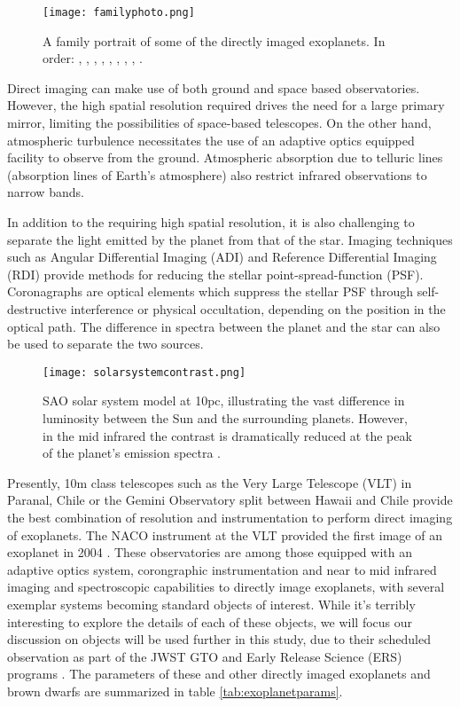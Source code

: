 \begin{figure}[t]
	\centering
	\texttt{[image: familyphoto.png]}
	\caption{A family portrait of some of the directly imaged exoplanets.
		In order:
	\parencite{Marois2010}, \parencite{Rameau2013}, \parencite{Stolker2020}, \parencite{Sallum2015}, \parencite{Keppler2018}, \parencite{Currie2012}, \parencite{Macintosh2015}, \parencite{Chauvin2004}, \parencite{Quanz2010}.}
	\label{fig:family}
\end{figure}

Direct imaging can make use of both ground and space based observatories. 
However, the high spatial resolution required drives the need for a large primary mirror, limiting the possibilities of space-based telescopes. 
On the other hand, atmospheric turbulence necessitates the use of an adaptive optics equipped facility to observe from the ground. 
Atmospheric absorption due to telluric lines (absorption lines of Earth's atmosphere) also restrict infrared observations to narrow bands.

In addition to the requiring high spatial resolution, it is also challenging to separate the light emitted by the planet from that of the star.
Imaging techniques such as Angular Differential Imaging (ADI) \parencite{Marois2006} and Reference Differential Imaging (RDI) \parencite{Lafreniere2009,Soummer2011} provide methods for reducing the stellar point-spread-function (PSF). %
Coronagraphs are optical elements which suppress the stellar PSF through self-destructive interference or physical occultation, depending on the position in the optical path.
The difference in spectra between the planet and the star can also be used to separate the two sources.

\begin{figure}[t]
	\centering
	\texttt{[image: solarsystemcontrast.png]}
	\caption{SAO solar system model at 10pc, illustrating the vast difference in luminosity between the Sun and the surrounding planets. However, in the mid infrared the contrast is dramatically reduced at the peak of the planet's emission spectra \parencite{DesMarais2002}.}
	\label{fig:solarsystem}
\end{figure}
Presently, 10m class telescopes such as the Very Large Telescope (VLT) in Paranal, Chile or the Gemini Observatory split between Hawaii and Chile provide the best combination of resolution and instrumentation to perform direct imaging of exoplanets.
The NACO instrument at the VLT provided the first image of an exoplanet in 2004 \parencite{Chauvin2004}.
These observatories are among those equipped with an adaptive optics system, corongraphic instrumentation and near to mid infrared imaging and spectroscopic capabilities to directly image exoplanets, with several exemplar systems becoming standard objects of interest.
While it's terribly interesting to explore the details of each of these objects, we will focus our discussion on objects will be used further in this study, due to their scheduled observation as part of the JWST GTO and Early Release Science (ERS) programs \parencite{Beichman2019}. 
The parameters of these and other directly imaged exoplanets and brown dwarfs are summarized in table \ref{tab:exoplanetparams}. 

